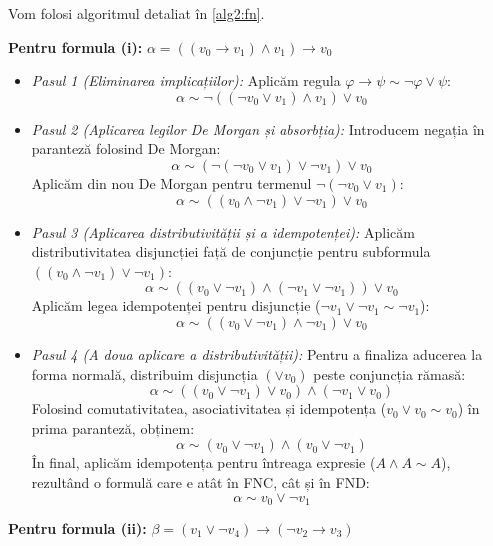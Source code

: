 \begin{solutie}

Vom folosi algoritmul detaliat în \ref{alg2:fn}.

\vspace{0.3cm}
\noindent \textbf{Pentru formula (i):} $\alpha = ((v_0 \rightarrow v_1) \land v_1) \rightarrow v_0$

\begin{itemize}
    \item \textit{Pasul 1 (Eliminarea implicațiilor):}
          Aplicăm regula $\varphi \rightarrow \psi \sim \neg \varphi \lor \psi$:
          \[ \alpha \sim \neg ((\neg v_0 \lor v_1) \land v_1) \lor v_0 \]
    \item \textit{Pasul 2 (Aplicarea legilor De Morgan și absorbția):}
          Introducem negația în paranteză folosind De Morgan:
          \[ \alpha \sim (\neg (\neg v_0 \lor v_1) \lor \neg v_1) \lor v_0 \]
          Aplicăm din nou De Morgan pentru termenul $\neg (\neg v_0 \lor v_1)$:
          \[ \alpha \sim ((v_0 \land \neg v_1) \lor \neg v_1) \lor v_0 \]
    \item \textit{Pasul 3 (Aplicarea distributivității și a idempotenței):}
	      Aplicăm distributivitatea disjuncției față de conjuncție pentru subformula $((v_0 \land \neg v_1) \lor \neg v_1)$:
	      \[ \alpha \sim ((v_0 \lor \neg v_1) \land (\neg v_1 \lor \neg v_1)) \lor v_0 \]
	      Aplicăm legea idempotenței pentru disjuncție ($\neg v_1 \lor \neg v_1 \sim \neg v_1$):
	      \[ \alpha \sim ((v_0 \lor \neg v_1) \land \neg v_1) \lor v_0 \]

	\item \textit{Pasul 4 (A doua aplicare a distributivității):}
	      Pentru a finaliza aducerea la forma normală, distribuim disjuncția $(\lor v_0)$ peste conjuncția rămasă:
	      \[ \alpha \sim ((v_0 \lor \neg v_1) \lor v_0) \land (\neg v_1 \lor v_0) \]
	      Folosind comutativitatea, asociativitatea și idempotența ($v_0 \lor v_0 \sim v_0$) în prima paranteză, obținem:
	      \[ \alpha \sim (v_0 \lor \neg v_1) \land (v_0 \lor \neg v_1) \]
	      În final, aplicăm idempotența pentru întreaga expresie ($A \land A \sim A$), rezultând o formulă care e atât în FNC, cât și
          în FND:
	      \[ \alpha \sim v_0 \lor \neg v_1 \]
\end{itemize}


\noindent \textbf{Pentru formula (ii):} $\beta = (v_1 \lor \neg v_4) \rightarrow (\neg v_2 \rightarrow v_3)$


\end{solutie}
